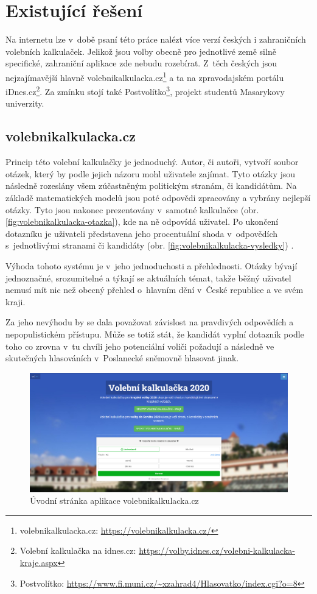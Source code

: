 \section{Existující řešení}
Na internetu lze v~době psaní této práce nalézt více verzí českých i zahraničních volebních kalkulaček. Jelikož jsou volby obecně pro jednotlivé země silně specifické, zahraniční aplikace zde nebudu rozebírat. Z~těch českých jsou nejzajímavější hlavně volebnikalkulacka.cz\footnote{volebnikalkulacka.cz: \url{https://volebnikalkulacka.cz/}} a ta na zpravodajském portálu iDnes.cz\footnote{Volební kalkulačka na idnes.cz: \url{https://volby.idnes.cz/volebni-kalkulacka-kraje.aspx}}. Za zmínku stojí také Postvolítko\footnote{Postvolítko: \url{https://www.fi.muni.cz/~xzahrad4/Hlasovatko/index.cgi?o=8}}, projekt studentů Masarykovy univerzity. 

\subsection{volebnikalkulacka.cz}
Princip této volební kalkulačky  je jednoduchý. Autor, či autoři, vytvoří soubor otázek, který by podle jejich názoru mohl uživatele zajímat. Tyto otázky jsou následně rozeslány všem zúčastněným politickým stranám, či kandidátům. Na základě matematických modelů jsou poté odpovědi zpracovány a vybrány nejlepší otázky. Tyto jsou nakonec prezentovány v~samotné kalkulačce (obr. \ref{fig:volebnikalkulacka-otazka}), kde na ně odpovídá uživatel. Po ukončení dotazníku je uživateli představena jeho procentuální shoda v~odpovědích s~jednotlivými stranami či kandidáty (obr. \ref{fig:volebnikalkulacka-vysledky}) \cite{volebnikalkulacka-info}.
\par Výhoda tohoto systému je v~jeho jednoduchosti a přehlednosti. Otázky bývají jednoznačné, srozumitelné a týkají se aktuálních témat, takže běžný uživatel nemusí mít nic než obecný přehled o~hlavním dění v~České republice a ve svém kraji. 
\par Za jeho nevýhodu by se dala považovat závislost na pravdivých odpovědích a nepopulistickém přístupu. Může se totiž stát, že kandidát vyplní dotazník podle toho co zrovna v~tu chvíli jeho potenciální voliči požadují a následně ve skutečných hlasováních v~Poslanecké sněmovně hlasovat jinak.
\\

\begin{figure}
    \centering
    \includegraphics[width=1\textwidth]{obrazky-figures/volebnikalkulackacz-uvod.png}
    \caption{Úvodní stránka aplikace volebnikalkulacka.cz}
    \label{fig:volebnikalkulacka-uvod}
\end{figure}

